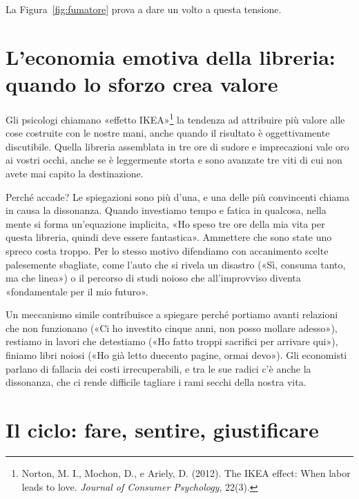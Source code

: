 La Figura~\ref{fig:fumatore} prova a dare un volto a questa tensione.


\section{L'economia emotiva della libreria: quando lo sforzo crea valore}
\label{sec:p1c22-armadio}

Gli psicologi chiamano «effetto IKEA»\footnote{Norton, M. I., Mochon, D., e Ariely, D. (2012). The IKEA effect: When labor leads to love. \textit{Journal of Consumer Psychology}, 22(3).} la tendenza ad attribuire più valore alle cose costruite con le nostre mani, anche quando il risultato è oggettivamente discutibile. Quella libreria assemblata in tre ore di sudore e imprecazioni vale oro ai vostri occhi, anche se è leggermente storta e sono avanzate tre viti di cui non avete mai capito la destinazione.

Perché accade? Le spiegazioni sono più d'una, e una delle più convincenti chiama in causa la dissonanza. Quando investiamo tempo e fatica in qualcosa, nella mente si forma un'equazione implicita, «Ho speso tre ore della mia vita per questa libreria, quindi deve essere fantastica». Ammettere che sono state uno spreco costa troppo. Per lo stesso motivo difendiamo con accanimento scelte palesemente sbagliate, come l'auto che si rivela un disastro («Sì, consuma tanto, ma che linea») o il percorso di studi noioso che all'improvviso diventa «fondamentale per il mio futuro».

Un meccanismo simile contribuisce a spiegare perché portiamo avanti relazioni che non funzionano («Ci ho investito cinque anni, non posso mollare adesso»), restiamo in lavori che detestiamo («Ho fatto troppi sacrifici per arrivare qui»), finiamo libri noiosi («Ho già letto duecento pagine, ormai devo»). Gli economisti parlano di fallacia dei costi irrecuperabili, e tra le sue radici c'è anche la dissonanza, che ci rende difficile tagliare i rami secchi della nostra vita.

\section{Il ciclo: fare, sentire, giustificare}

